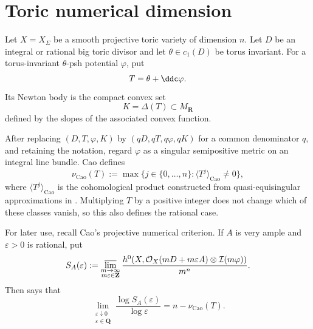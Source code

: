 \section{Toric numerical dimension}
\label{sec:verified-toric-dimension}

Let \(X=X_\Sigma\) be a smooth projective toric variety of dimension
\(n\). Let \(D\) be an integral or rational big toric divisor and let
\(\theta\in c_1(D)\) be torus invariant. For a torus-invariant
\(\theta\)-psh potential \(\varphi\), put
\[
                         T=\theta+\ddc\varphi.
\]
Its Newton body is the compact convex set
\[
                         K=\Delta(T)\subset M_{\mathbf R}
\tag{69.25}\label{eq:verified-newton-body}
\]
defined by the slopes of the associated convex function.

\begin{definition}
\label{def:verified-cao-dimension}
After replacing \((D,T,\varphi,K)\) by
\((qD,qT,q\varphi,qK)\) for a common denominator \(q\), and retaining
the notation, regard \(\varphi\) as a singular semipositive metric on
an integral line bundle. Cao defines
\[
 \nu_{\mathrm{Cao}}(T)
   :=\max\bigl\{j\in\{0,\ldots,n\}:
       \langle T^j\rangle_{\mathrm{Cao}}\ne0\bigr\},
\]
where \(\langle T^j\rangle_{\mathrm{Cao}}\) is the cohomological
product constructed from quasi-equisingular approximations in
\cite[Definitions~3--4]{Cao14}. Multiplying \(T\) by a positive
integer does not change which of these classes vanish, so this also
defines the rational case.
\end{definition}

For later use, recall Cao's projective numerical criterion. If \(A\)
is very ample and \(\varepsilon>0\) is rational, put
\[
 S_A(\varepsilon)
 :=\varlimsup_{\substack{m\to\infty\\m\varepsilon\in\mathbf Z}}
 \frac{h^0\!\left(X,
   \mathcal O_X(mD+m\varepsilon A)\otimes
   \mathcal I(m\varphi)\right)}{m^n}.
\]
Then \cite[Proposition~4.4]{Cao14} says that
\[
 \lim_{\substack{\varepsilon\downarrow0\\
                  \varepsilon\in\mathbf Q}}
       \frac{\log S_A(\varepsilon)}{\log\varepsilon}
       =n-\nu_{\mathrm{Cao}}(T).
\tag{69.26}\label{eq:verified-cao-characterization}
\]
